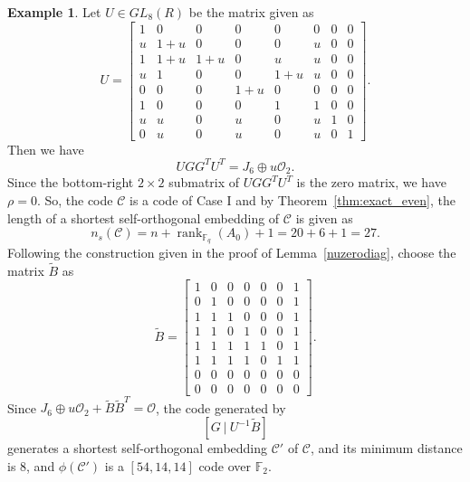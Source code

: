 \documentclass{article}
\theoremstyle{definition}
\newtheorem{example}{Example}[section]
\theoremstyle{remark}
\begin{document}
\begin{example}
    Let $U\in GL_{8}(R)$ be the matrix given as
    \[
    U=\begin{bmatrix}
    1 & 0 & 0 & 0 & 0 & 0 & 0 & 0\\
    u & 1+u & 0 & 0 & 0 & u & 0 & 0\\
    1 & 1+u & 1+u & 0 & u & u & 0 & 0\\
    u & 1 & 0 & 0 & 1+u & u & 0 & 0\\
    0 & 0 & 0 & 1+u & 0 & 0 & 0 & 0\\
    1 & 0 & 0 & 0 & 1 & 1 & 0 & 0\\
    u & u & 0 & u & 0 & u & 1 & 0\\
    0 & u & 0 & u & 0 & u & 0 & 1
    \end{bmatrix}.
    \]
    Then we have
    \[
    UGG^TU^T=J_6\oplus u\mathcal{O}_2.
    \]
    Since the bottom-right $2\times 2$ submatrix of $UGG^TU^T$ is the zero matrix, we have $\rho=0$. So, the code $\mathcal{C}$ is a code of Case I and by Theorem~\ref{thm:exact_even}, the length of a shortest self-orthogonal embedding of $\mathcal{C}$ is given as
    \[
    n_s(\mathcal{C})=n+\operatorname{rank}_{\mathbb{F}_q}(A_0)+1=20+6+1=27.
    \]
    Following the construction given in the proof of Lemma~\ref{nuzerodiag}, choose the matrix $\tilde{B}$ as 
    \[
    \tilde{B}=\begin{bmatrix}
    1 & 0 & 0 & 0 & 0 & 0 & 1\\
    0 & 1 & 0 & 0 & 0 & 0 & 1\\
    1 & 1 & 1 & 0 & 0 & 0 & 1\\
    1 & 1 & 0 & 1 & 0 & 0 & 1\\
    1 & 1 & 1 & 1 & 1 & 0 & 1\\
    1 & 1 & 1 & 1 & 0 & 1 & 1\\
    0 & 0 & 0 & 0 & 0 & 0 & 0\\
    0 & 0 & 0 & 0 & 0 & 0 & 0
    \end{bmatrix}.
    \]
    Since $J_6\oplus u\mathcal{O}_2+\tilde{B}\tilde{B}^T=\mathcal{O}$, the code generated by
    \[
    [G~|~U^{-1}\tilde{B}]
    \]
    generates a shortest self-orthogonal embedding $\mathcal{C}'$ of $\mathcal{C}$, and its minimum distance is 8, and $\phi(\mathcal{C}')$ is a $[54, 14, 14]$ code over $\mathbb{F}_2$.
    

\end{example}
\end{document}
